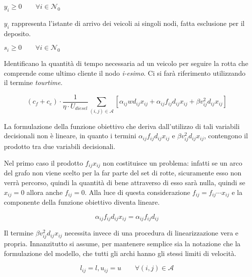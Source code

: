 	\begin{minipage}[t]{\varwidth}
		$y_i \geq 0 \qquad \forall i \in \mathcal{N}_0$
	\end{minipage}
	\begin{minipage}[t]{\descwidth}
		$y_i$ rappresenta l’istante di arrivo dei veicoli ai singoli nodi, fatta esclusione per il deposito.
	\end{minipage}

	\begin{minipage}[t]{\varwidth}
		$s_i \geq 0 \qquad \forall i \in \mathcal{N}_0$
	\end{minipage}
	\begin{minipage}[t]{\descwidth}
		Identificano la quantità di tempo necessaria ad un veicolo per seguire la rotta che comprende come ultimo cliente il nodo \emph{i-esimo}. Ci si farà riferimento utilizzando il termine \emph{tourtime}.
	\end{minipage}

	\begin{equation}
		\label{eq:fuel_emission_cost}
		 (c_f + c_e) \cdot 
		 \frac{1}{\eta \cdot U_{diesel}} 
		 \sum_{(i,j) \in \mathcal{A}} \left[
		 	\alpha_{ij}wd_{ij}x_{ij} + 
		 	\alpha_{ij}f_{ij}d_{ij}x_{ij} + 
		 	\beta v_{ij}^2 d_{ij} x_{ij}
		 \right]
	\end{equation}

	La formulazione della funzione obiettivo che deriva dall’utilizzo di tali variabili decisionali non è lineare, in quanto i termini $\alpha_{ij}f_{ij}d_{ij}x_{ij}$ e $\beta v_{ij}^2 d_{ij} x_{ij}$, contengono il prodotto tra due variabili decisionali.

	Nel primo caso il prodotto $f_{ij}x_{ij}$ non costituisce un problema: infatti se un arco del grafo non viene scelto per la far parte del set di rotte, sicuramente esso non verrà percorso, quindi la quantità di bene attraverso di esso sarà nulla, quindi se $x_{ij} = 0$ allora anche $f_{ij} = 0$. Alla luce di questa considerazione $f_{ij} = f_{ij} \cdots x_{ij}$ e la componente della funzione obiettivo diventa lineare.

	$$\alpha_{ij}f_{ij}d_{ij}x_{ij} = \alpha_{ij}f_{ij}d_{ij}$$

	Il termine $\beta v_{ij}^2 d_{ij} x_{ij}$ necessita invece di una procedura di linearizzazione vera e propria. Innanzitutto si assume, per mantenere semplice sia la notazione che la formulazione del modello, che tutti gli archi hanno gli stessi limiti di velocità.

	$$l_{ij} = l, u_{ij} = u \qquad \forall (i,j) \in \mathcal{A}$$

